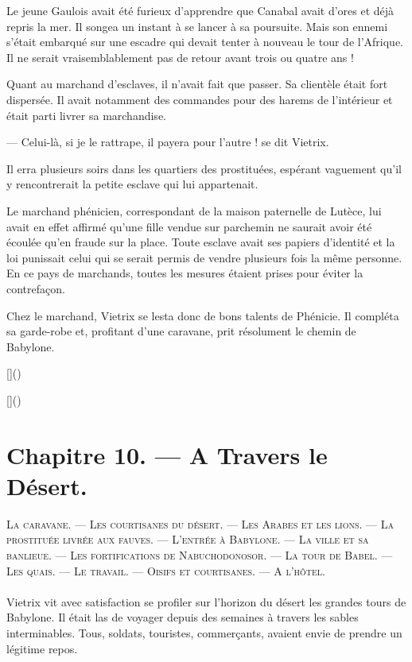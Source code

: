 \documentclass[a4paper, 11pt, oneside, polutonikogreek, french]{article}
\begin{document}
\bigskip
\centerline{\EightStarTaper}
\centerline{\EightStarTaper\EightStarTaper}
\bigskip

Le jeune Gaulois avait été furieux d'apprendre que Canabal avait d'ores et déjà repris la mer. Il songea un instant à se lancer à sa poursuite. Mais son ennemi s'était embarqué sur une escadre qui devait tenter à nouveau le tour de l'Afrique. Il ne serait vraisemblablement pas de retour avant trois ou quatre ans !

Quant au marchand d'esclaves, il n'avait fait que passer. Sa clientèle était fort dispersée. Il avait notamment des commandes pour des harems de l'intérieur et était parti livrer sa marchandise.

--- Celui-là, si je le rattrape, il payera pour l'autre ! se dit Vietrix.

Il erra plusieurs soirs dans les quartiers des prostituées, espérant vaguement qu'il y rencontrerait la petite esclave qui lui appartenait.

Le marchand phénicien, correspondant de la maison paternelle de Lutèce, lui avait en effet affirmé qu'une fille vendue sur parchemin ne saurait avoir été écoulée qu'en fraude sur la place. Toute esclave avait ses papiers d'identité et la loi punissait celui qui se serait permis de vendre plusieurs fois la même personne. En ce pays de marchands, toutes les mesures étaient prises pour éviter la contrefaçon.

Chez le marchand, Vietrix se lesta donc de bons talents de Phénicie. Il compléta sa garde-robe et, profitant d'une caravane, prit résolument le chemin de Babylone.

[]()

[]()
\clearpage
\section{Chapitre 10. --- A Travers le Désert.}
\begin{center}
\scshape
\small
La caravane. --- Les courtisanes du désert. --- Les Arabes et les lions. --- La prostituée livrée aux fauves. --- L'entrée à Babylone. --- La ville et sa banlieue. --- Les fortifications de Nabuchodonosor. --- La tour de Babel. --- Les quais. --- Le travail. --- Oisifs et courtisanes. --- A l'hôtel.
\end{center}
\paragraph{}
Vietrix vit avec satisfaction se profiler sur l'horizon du désert les grandes tours de Babylone. Il était las de voyager depuis des semaines à travers les sables interminables. Tous, soldats, touristes, commerçants, avaient envie de prendre un légitime repos.
\end{document}
